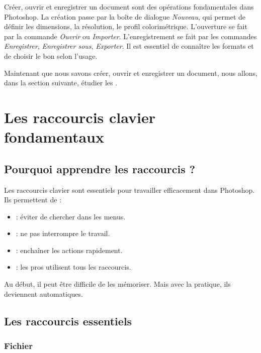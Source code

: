 Créer, ouvrir et enregistrer un document sont des opérations fondamentales dans Photoshop. La création passe par la boîte de dialogue \emph{Nouveau}, qui permet de définir les dimensions, la résolution, le profil colorimétrique. L'ouverture se fait par la commande \emph{Ouvrir} ou \emph{Importer}. L'enregistrement se fait par les commandes \emph{Enregistrer}, \emph{Enregistrer sous}, \emph{Exporter}. Il est essentiel de connaître les formats et de choisir le bon selon l'usage.

Maintenant que nous savons créer, ouvrir et enregistrer un document, nous allons, dans la section suivante, étudier les .

\section{Les raccourcis clavier fondamentaux}

\subsection{Pourquoi apprendre les raccourcis ?}

Les raccourcis clavier sont essentiels pour travailler efficacement dans Photoshop. Ils permettent de :

\begin{itemize}
    \item {} : éviter de chercher dans les menus.
    \item {} : ne pas interrompre le travail.
    \item {} : enchaîner les actions rapidement.
    \item {} : les pros utilisent tous les raccourcis.
\end{itemize}

Au début, il peut être difficile de les mémoriser. Mais avec la pratique, ils deviennent automatiques.

\subsection{Les raccourcis essentiels}

\subsubsection{Fichier}

